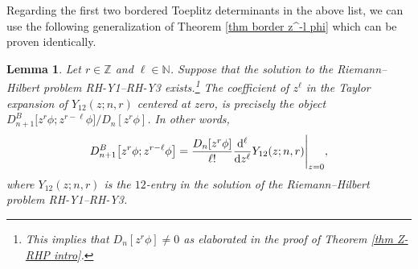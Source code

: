 \documentclass[pdftex]{sigma}
\numberwithin{equation}{section}
\newtheorem{Lemma}[Theorem]{Lemma}
 { \theoremstyle{definition}
\newtheorem{Definition}[Theorem]{Definition}
\newtheorem{Example}[Theorem]{Example}
\newtheorem{Remark}[Theorem]{Remark}
\newtheorem{Question}[Theorem]{Question}
}
\newcommand{\Z}{{\mathbb Z}}
\newcommand{\N}{{\mathbb N}}
\newcommand{\dd}{{\rm d}}
\begin{document}
		Regarding the first two bordered Toeplitz determinants in the above list, we can use the following generalization of Theorem \ref{thm border z^-l phi} which can be proven identically.
		
		\begin{Lemma}
			Let $r \in \Z$ and $\ell \in \N$. Suppose that the solution to the Riemann--Hilbert problem {\rm RH-Y1}--{\rm RH-Y3} exists.\footnote{This implies that $D_n[z^r\phi]\neq 0$ as elaborated in the proof of Theorem \ref{thm Z-RHP intro}.} The coefficient of $z^{\ell}$ in the Taylor expansion of $Y_{12}(z;n,r)$ centered at zero, is precisely the object $D^B_{n+1}\big[z^r\phi;z^{r-\ell}\phi\big]/D_n[z^r\phi]$. In other words,
			\begin{equation*}
				D^B_{n+1}\big[z^{r}\phi;z^{r-\ell}\phi\big] = \frac{D_n[z^{r}\phi]}{\ell!} \frac{\dd ^{\ell}}{\dd z^{\ell}}Y_{12}(z;n,r) \Bigg|_{z=0},
			\end{equation*}
			where $Y_{12}(z;n,r)$ is the $12$-entry in the solution of the Riemann--Hilbert problem {\rm RH-Y1}--{\rm RH-Y3}.
		\end{Lemma}
		
\end{document}
